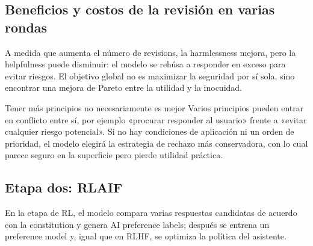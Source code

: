 


\subsection{Beneficios y costos de la revisión en varias rondas}

A medida que aumenta el número de revisions, la harmlessness mejora, pero la helpfulness puede disminuir: el modelo se rehúsa a responder en exceso para evitar riesgos. El objetivo global no es maximizar la seguridad por sí sola, sino encontrar una mejora de Pareto entre la utilidad y la inocuidad.


\begin{warningbox}{Tener más principios no necesariamente es mejor}
Varios principios pueden entrar en conflicto entre sí, por ejemplo «procurar responder al usuario» frente a «evitar cualquier riesgo potencial». Si no hay condiciones de aplicación ni un orden de prioridad, el modelo elegirá la estrategia de rechazo más conservadora, con lo cual parece seguro en la superficie pero pierde utilidad práctica.
\end{warningbox}

\subsection{Etapa dos: RLAIF}

En la etapa de RL, el modelo compara varias respuestas candidatas de acuerdo con la constitution y genera AI preference labels; después se entrena un preference model y, igual que en RLHF, se optimiza la política del asistente.


